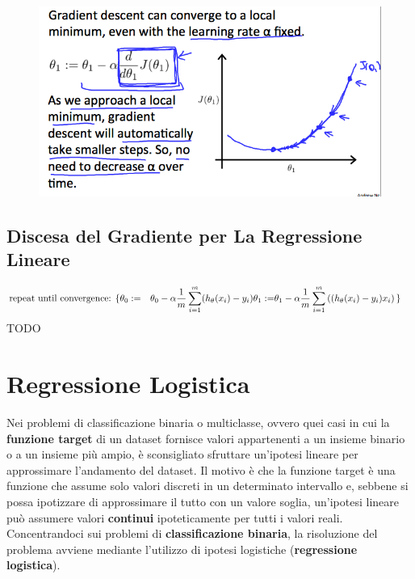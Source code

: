 \begin{figure}[h!]
    \centering
    \includegraphics[width=1\textwidth]{img/RDcJ-KGXEeaVChLw2Vaaug_cb782d34d272321e88f202940c36afe9_Screenshot-2016-11-03-00.06.00.png}
    \caption{}\label{GradientDescent4}
\end{figure}
\subsection{Discesa del Gradiente per La Regressione Lineare}
\begin{align} \text{repeat until convergence: } \lbrace & \newline \theta_0 := & \theta_0 - \alpha \frac{1}{m} \sum\limits_{i=1}^{m}(h_\theta(x_{i}) - y_{i}) \newline \theta_1 := & \theta_1 - \alpha \frac{1}{m} \sum\limits_{i=1}^{m}\left((h_\theta(x_{i}) - y_{i}) x_{i}\right) \newline \rbrace& \end{align}
TODO
\section{Regressione Logistica}
Nei problemi di classificazione binaria o multiclasse, ovvero quei casi in cui la \textbf{funzione target} di un dataset fornisce valori appartenenti a un insieme binario o a un insieme più ampio, è sconsigliato sfruttare un'ipotesi lineare per approssimare l'andamento del dataset. Il motivo è che la funzione target è una funzione che assume solo valori discreti in un determinato intervallo e, sebbene si possa ipotizzare di approssimare il tutto con un valore soglia, un'ipotesi lineare può assumere valori \textbf{continui} ipoteticamente per tutti i valori reali. Concentrandoci sui problemi di \textbf{classificazione binaria}, la risoluzione del problema avviene mediante l'utilizzo di ipotesi logistiche (\textbf{regressione logistica}). 
